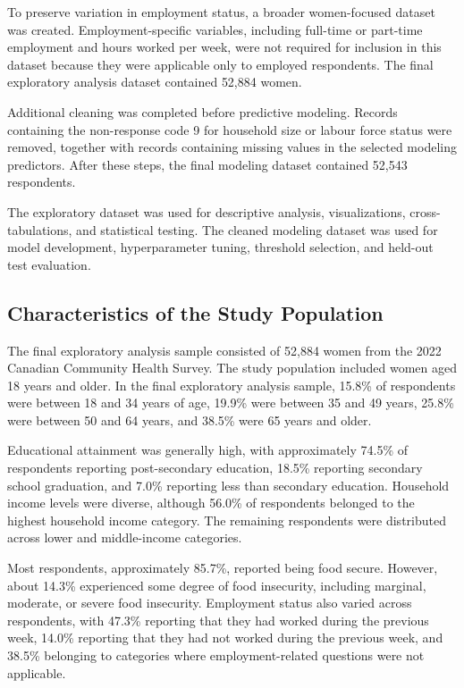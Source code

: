 \documentclass[12pt]{article}
\begin{document}
To preserve variation in employment status, a broader women-focused dataset was created. Employment-specific variables, including full-time or part-time employment and hours worked per week, were not required for inclusion in this dataset because they were applicable only to employed respondents. The final exploratory analysis dataset contained 52,884 women.

Additional cleaning was completed before predictive modeling. Records containing the non-response code 9 for household size or labour force status were removed, together with records containing missing values in the selected modeling predictors. After these steps, the final modeling dataset contained 52,543 respondents.

The exploratory dataset was used for descriptive analysis, visualizations, cross-tabulations, and statistical testing. The cleaned modeling dataset was used for model development, hyperparameter tuning, threshold selection, and held-out test evaluation.

\subsection{Characteristics of the Study Population}

The final exploratory analysis sample consisted of 52,884 women from the 2022 Canadian Community Health Survey. The study population included women aged 18 years and older. In the final exploratory analysis sample, 15.8\% of respondents were between 18 and 34 years of age, 19.9\% were between 35 and 49 years, 25.8\% were between 50 and 64 years, and 38.5\% were 65 years and older.

Educational attainment was generally high, with approximately 74.5\% of respondents reporting post-secondary education, 18.5\% reporting secondary school graduation, and 7.0\% reporting less than secondary education. Household income levels were diverse, although 56.0\% of respondents belonged to the highest household income category. The remaining respondents were distributed across lower and middle-income categories.

Most respondents, approximately 85.7\%, reported being food secure. However, about 14.3\% experienced some degree of food insecurity, including marginal, moderate, or severe food insecurity. Employment status also varied across respondents, with 47.3\% reporting that they had worked during the previous week, 14.0\% reporting that they had not worked during the previous week, and 38.5\% belonging to categories where employment-related questions were not applicable.
\end{document}
